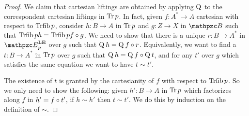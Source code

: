 \documentclass{lmcs} %
\theoremstyle{plain}\newtheorem{satz}[thm]{Satz} %
\begin{document}
			\begin{proof}
				We claim that cartesian liftings are obtained by applying $\mathop{\mathrm{Q}}\nolimits^{}$ to the correspondent cartesian liftings in $\mathop{\mathrm{Tr}}\nolimits{p}$. In fact, given $f:A^*\to A$ cartesian with respect to $\mathop{\mathrm{Trfib}}\nolimits p$, consider $h:B\to A$ in $\mathop{\mathrm{Tr}}\nolimits{p}$ and $g:Z\to X$ in $\ct{B}$ such that $\mathop{\mathrm{Trfib}}\nolimits ph=\mathop{\mathrm{Trfib}}\nolimits pf\circ g$. We need to show that there is a unique $r:B\to A^*$ in $\LEDomE{p}$ over $g$ such that $\mathop{\mathrm{Q}}\nolimits^{}h=\mathop{\mathrm{Q}}\nolimits^{}f\circ r$. Equivalently, we want to find a $t:B\to A^*$ in $\mathop{\mathrm{Tr}}\nolimits{p}$ over $g$ such that $\mathop{\mathrm{Q}}\nolimits^{}h=\mathop{\mathrm{Q}}\nolimits^{}f\circ \mathop{\mathrm{Q}}\nolimits^{}t$, and for any $t'$ over $g$ which satisfies the same equation we want to have $t\sim t'$.
				
The existence of $t$ is granted by the cartesianity of $f$ with respect to $\mathop{\mathrm{Trfib}}\nolimits p$. 
So we only need to show the following: given $h':B\to A$ in $\mathop{\mathrm{Tr}}\nolimits{p}$ which factorizes along $f$ in $h'=f\circ t'$, if $h\sim h'$ then $t\sim t'$. We do this by induction on the definition of $\sim$.
				

\end{proof}
\end{document}
